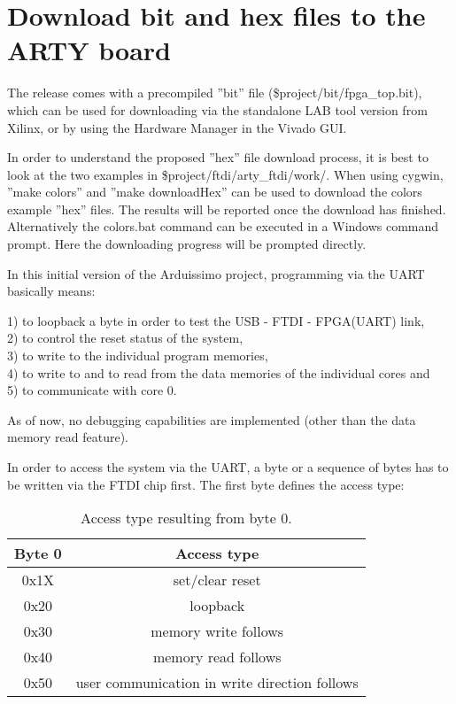 \chapter{Download bit and hex files to the ARTY board}
\label{atomics}


The release comes with a precompiled ''bit'' file (\$project/bit/fpga\_top.bit), which can be used for downloading via the standalone LAB tool version from Xilinx, or by using the Hardware Manager in the Vivado GUI.

In order to understand the proposed ''hex'' file download process, it is best to look at the two examples in \$project/ftdi/arty\_ftdi/work/. When using cygwin, ''make colors'' and ''make downloadHex'' can be used to download the colors example ''hex'' files. The results will be reported once the download has finished. Alternatively the colors.bat command can be executed in a Windows command prompt. Here the downloading progress will be prompted directly.

In this initial version of the Arduissimo project, programming via the UART basically means: 

1) to loopback a byte in order to test the USB - FTDI - FPGA(UART) link,\\
2) to control the reset status of the system,\\
3) to write to the individual program memories,\\
4) to write to and to read from the data memories of the individual cores and\\
5) to communicate with core 0.

As of now, no debugging capabilities are implemented (other than the data memory read feature).

In order to access the system via the UART, a byte or a sequence of bytes has to be written via the FTDI chip first. The first byte defines the access type:

\begin{table}[h]
	{
		\begin{small}
			\begin{center}
				\begin{tabular}{c c}
					\hline
					\multicolumn{1}{|c|}{Byte 0} &
					\multicolumn{1}{|c|}{Access type} \\
					\hline
					\multicolumn{1}{|c|}{0x1X} &
					\multicolumn{1}{|c|}{set/clear reset} \\
					\hline
					\multicolumn{1}{|c|}{0x20} &
					\multicolumn{1}{|c|}{loopback} \\
					\hline
					\multicolumn{1}{|c|}{0x30} &
					\multicolumn{1}{|c|}{memory write follows} \\
					\hline
					\multicolumn{1}{|c|}{0x40} &
					\multicolumn{1}{|c|}{memory read follows} \\
					\hline
					\multicolumn{1}{|c|}{0x50} &
					\multicolumn{1}{|c|}{user communication in write direction follows} \\
					\hline
				\end{tabular}
			\end{center}
		\end{small}
	}
	\caption{Access type resulting from byte 0.}
	\label{uart_byte_0}
\end{table}

